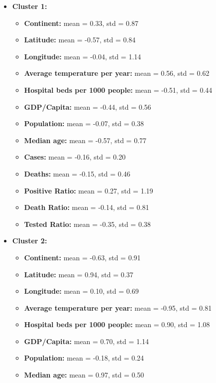 \documentclass[12pt,a4paper]{article}
\begin{document}
\begin{itemize}
    \item \textbf{Cluster 1:}
        \begin{itemize}
            \item \textbf{Continent:} mean = 0.33, std = 0.87
            \item \textbf{Latitude: }mean = -0.57, std = 0.84
            \item \textbf{Longitude:} mean = -0.04, std = 1.14
            \item \textbf{Average temperature per year:} mean = 0.56, std = 0.62
            \item \textbf{Hospital beds per 1000 people:} mean = -0.51, std = 0.44
            \item \textbf{GDP/Capita:} mean = -0.44, std = 0.56
            \item \textbf{Population:} mean = -0.07, std = 0.38
            \item \textbf{Median age:} mean = -0.57, std = 0.77
            \item \textbf{Cases:} mean = -0.16, std = 0.20
            \item \textbf{Deaths:} mean = -0.15, std = 0.46
            \item \textbf{Positive Ratio:} mean = 0.27, std = 1.19
            \item \textbf{Death Ratio:} mean = -0.14, std = 0.81
            \item \textbf{Tested Ratio:} mean = -0.35, std = 0.38
        \end{itemize}
    \item \textbf{Cluster 2:}
        \begin{itemize}
            \item \textbf{Continent:} mean = -0.63, std = 0.91
            \item \textbf{Latitude:} mean = 0.94, std = 0.37
            \item \textbf{Longitude:} mean = 0.10, std = 0.69
            \item \textbf{Average temperature per year:} mean = -0.95, std = 0.81
            \item \textbf{Hospital beds per 1000 people:} mean = 0.90, std = 1.08
            \item \textbf{GDP/Capita:} mean = 0.70, std = 1.14
            \item \textbf{Population:} mean = -0.18, std = 0.24
            \item \textbf{Median age:} mean = 0.97, std = 0.50

\end{itemize}
\end{itemize}
\end{document}
